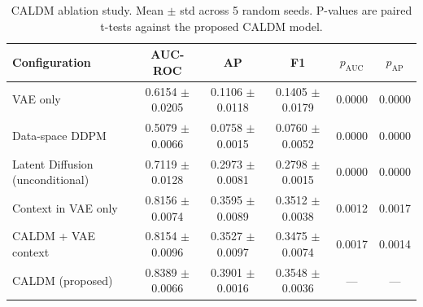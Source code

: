 \begin{table}[h]
\centering
\caption{CALDM ablation study. Mean $\pm$ std across 5 random seeds. P-values are paired t-tests against the proposed CALDM model.}
\label{tab:ablation}
\begin{tabular}{lccccc}
\toprule
Configuration & AUC-ROC & AP & F1 & $p_{\text{AUC}}$ & $p_{\text{AP}}$ \\
\midrule
VAE only & 0.6154 $\pm$ 0.0205 & 0.1106 $\pm$ 0.0118 & 0.1405 $\pm$ 0.0179 & 0.0000 & 0.0000 \\
Data-space DDPM & 0.5079 $\pm$ 0.0066 & 0.0758 $\pm$ 0.0015 & 0.0760 $\pm$ 0.0052 & 0.0000 & 0.0000 \\
Latent Diffusion (unconditional) & 0.7119 $\pm$ 0.0128 & 0.2973 $\pm$ 0.0081 & 0.2798 $\pm$ 0.0015 & 0.0000 & 0.0000 \\
Context in VAE only & 0.8156 $\pm$ 0.0074 & 0.3595 $\pm$ 0.0089 & 0.3512 $\pm$ 0.0038 & 0.0012 & 0.0017 \\
CALDM + VAE context & 0.8154 $\pm$ 0.0096 & 0.3527 $\pm$ 0.0097 & 0.3475 $\pm$ 0.0074 & 0.0017 & 0.0014 \\
CALDM (proposed) & 0.8389 $\pm$ 0.0066 & 0.3901 $\pm$ 0.0016 & 0.3548 $\pm$ 0.0036 & --- & --- \\
\bottomrule
\end{tabular}
\end{table}